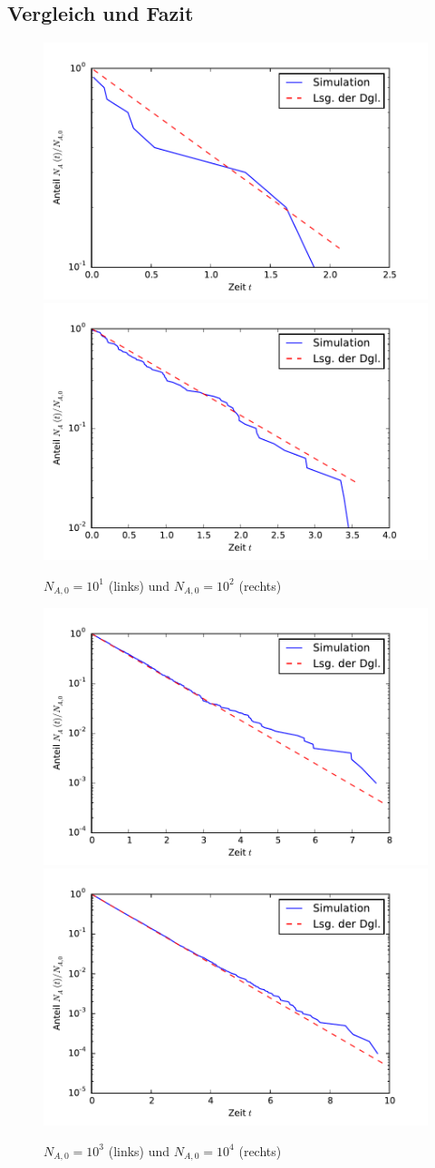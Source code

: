 \documentclass{scrartcl}
\begin{document}
\subsection{Vergleich und Fazit}
\begin{minipage}{\textwidth}
\begin{figure}[H]
    \includegraphics[width=.475\textwidth]{A1n10.pdf}
    \includegraphics[width=.475\textwidth]{A1n100.pdf}
    \caption{$N_{A, 0} = 10^1$ (links) und $N_{A, 0} = 10^2$ (rechts)}
\end{figure}
\end{minipage}
\begin{minipage}{\textwidth}
\begin{figure}[H]
    \includegraphics[width=.475\textwidth]{A1n1000.pdf}
    \includegraphics[width=.475\textwidth]{A1n10000.pdf}
    \caption{$N_{A, 0} = 10^3$ (links) und $N_{A, 0} = 10^4$ (rechts)}
\end{figure}
\end{minipage}
\end{document}
